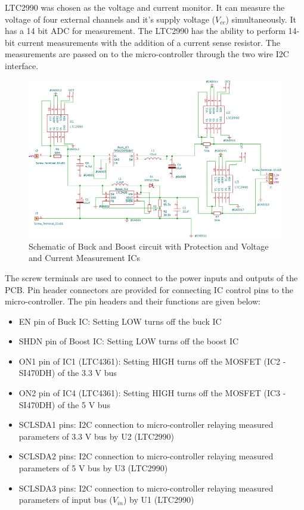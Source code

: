  LTC2990 was chosen as the voltage  and current monitor. It can measure the voltage of four external channels and it's supply voltage ($V_{cc}$) simultaneously. It has a 14 bit ADC for measurement. The LTC2990 has the ability to perform 14-bit current measurements with the addition of a current sense resistor. The measurements are passed on to the micro-controller through the two wire I2C interface.
 \begin{center}
 \begin{figure}[h]
 	\centering
 	\includegraphics[width=\columnwidth]{IMGS/1.pdf}
 	\caption{\centering Schematic of Buck and Boost circuit with Protection and Voltage and Current Measurement ICs}
 	\label{fig:bubo2}
 \end{figure}
\end{center}
The screw terminals are used to connect to the power inputs and outputs of the PCB. Pin header connectors are provided for connecting IC control pins to the micro-controller. The pin headers and their functions are given below:
 \begin{itemize}
 	\item EN pin of Buck IC: Setting LOW turns off the buck IC
 	\item SHDN pin of Boost IC: Setting LOW turns off the boost IC
 	\item ON1 pin of IC1 (LTC4361): Setting HIGH turns off the MOSFET (IC2 - SI470DH) of the 3.3 V bus
 	\item ON2 pin of IC4 (LTC4361): Setting HIGH turns off the MOSFET (IC3 - SI470DH) of the 5 V bus
 	\item SCLSDA1 pins: I2C connection to micro-controller relaying measured parameters of 3.3 V bus by U2 (LTC2990) 
 	\item SCLSDA2 pins: I2C connection to micro-controller relaying measured parameters of 5 V bus by U3 (LTC2990) 
 	\item SCLSDA3 pins: I2C connection to micro-controller relaying measured parameters of input bus ($V_{in}$) by U1 (LTC2990)
 \end{itemize}


